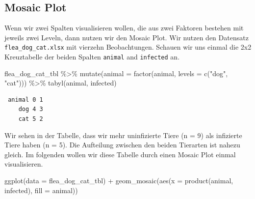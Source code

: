 \documentclass[
  letterpaper,
  DIV=11,
  oneside]{scrreport}
\newenvironment{Shaded}{\begin{snugshade}}{\end{snugshade}}
\newcommand{\AttributeTok}[1]{\textcolor[rgb]{0.40,0.45,0.13}{#1}}
\newcommand{\FunctionTok}[1]{\textcolor[rgb]{0.28,0.35,0.67}{#1}}
\newcommand{\NormalTok}[1]{\textcolor[rgb]{0.00,0.23,0.31}{#1}}
\newcommand{\SpecialCharTok}[1]{\textcolor[rgb]{0.37,0.37,0.37}{#1}}
\newcommand{\StringTok}[1]{\textcolor[rgb]{0.13,0.47,0.30}{#1}}
\begin{document}
\hypertarget{sec-eda-mosaic}{%
\subsection{Mosaic Plot}\label{sec-eda-mosaic}}

Wenn wir zwei Spalten visualisieren wollen, die aus zwei Faktoren
bestehen mit jeweils zwei Leveln, dann nutzen wir den Mosaic Plot. Wir
nutzen den Datensatz \texttt{flea\_dog\_cat.xlsx} mit vierzehn
Beobachtungen. Schauen wir uns einmal die 2x2 Kreuztabelle der beiden
Spalten \texttt{animal} and \texttt{infected} an.

\begin{Shaded}
\begin{Highlighting}[]
\NormalTok{flea\_dog\_cat\_tbl }\SpecialCharTok{\%\textgreater{}\%}
  \FunctionTok{mutate}\NormalTok{(}\AttributeTok{animal =} \FunctionTok{factor}\NormalTok{(animal, }\AttributeTok{levels =} \FunctionTok{c}\NormalTok{(}\StringTok{"dog"}\NormalTok{, }\StringTok{"cat"}\NormalTok{))) }\SpecialCharTok{\%\textgreater{}\%} 
  \FunctionTok{tabyl}\NormalTok{(animal, infected) }
\end{Highlighting}
\end{Shaded}

\begin{verbatim}
 animal 0 1
    dog 4 3
    cat 5 2
\end{verbatim}

Wir sehen in der Tabelle, dass wir mehr uninfizierte Tiere (n = 9) als
infizierte Tiere haben (n = 5). Die Aufteilung zwischen den beiden
Tierarten ist nahezu gleich. Im folgenden wollen wir diese Tabelle durch
einen Mosaic Plot einmal visualisieren.

\begin{Shaded}
\begin{Highlighting}[]
\FunctionTok{ggplot}\NormalTok{(}\AttributeTok{data =}\NormalTok{ flea\_dog\_cat\_tbl) }\SpecialCharTok{+}
  \FunctionTok{geom\_mosaic}\NormalTok{(}\FunctionTok{aes}\NormalTok{(}\AttributeTok{x =} \FunctionTok{product}\NormalTok{(animal, infected), }\AttributeTok{fill =}\NormalTok{ animal)) }
\end{Highlighting}
\end{Shaded}
\end{document}
